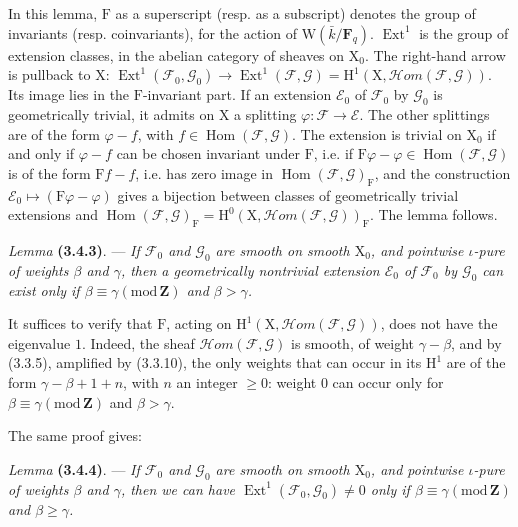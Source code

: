 \documentclass[11pt,leqno]{article}
\begin{document}
In this lemma, \(\mathrm{F}\) as a superscript (resp. as a subscript) denotes the group of invariants (resp. coinvariants), for the action of \(\mathrm{W}(\bar{k}/\mathbf{F}_q)\). \(\operatorname{Ext}^1\) is the group of extension classes, in the abelian category of sheaves on \(\mathrm{X}_0\). The right-hand arrow is pullback to \(\mathrm{X}\): \(\operatorname{Ext}^1(\mathscr{F}_0,\mathscr{G}_0)\to\operatorname{Ext}^1(\mathscr{F},\mathscr{G})=\mathrm{H}^1(\mathrm{X},\mathscr{H}\!om(\mathscr{F},\mathscr{G}))\). Its image lies in the \(\mathrm{F}\)-invariant part. If an extension \(\mathscr{E}_0\) of \(\mathscr{F}_0\) by \(\mathscr{G}_0\) is geometrically trivial, it admits on \(\mathrm{X}\) a splitting \(\varphi:\mathscr{F}\to\mathscr{E}\). The other splittings are of the form \(\varphi-f\), with \(f\in\operatorname{Hom}(\mathscr{F},\mathscr{G})\). The extension is trivial on \(\mathrm{X}_0\) if and only if \(\varphi-f\) can be chosen invariant under \(\mathrm{F}\), i.e. if \(\mathrm{F}\varphi-\varphi\in\operatorname{Hom}(\mathscr{F},\mathscr{G})\) is of the form \(\mathrm{F}f-f\), i.e. has zero image in \(\operatorname{Hom}(\mathscr{F},\mathscr{G})_{\mathrm{F}}\), and the construction \(\mathscr{E}_0\mapsto(\mathrm{F}\varphi-\varphi)\) gives a bijection between classes of geometrically trivial extensions and \(\operatorname{Hom}(\mathscr{F},\mathscr{G})_{\mathrm{F}}=\mathrm{H}^0(\mathrm{X},\mathscr{H}\!om(\mathscr{F},\mathscr{G}))_{\mathrm{F}}\). The lemma follows.

\textit{Lemma} \textbf{(3.4.3)}. — \textit{If \(\mathscr{F}_0\) and \(\mathscr{G}_0\) are smooth on smooth \(\mathrm{X}_0\), and pointwise \(\iota\)-pure of weights \(\beta\) and \(\gamma\), then a geometrically nontrivial extension \(\mathscr{E}_0\) of \(\mathscr{F}_0\) by \(\mathscr{G}_0\) can exist only if \(\beta\equiv\gamma(\mathrm{mod}\,\mathbf{Z})\) and \(\beta>\gamma\).}

It suffices to verify that \(\mathrm{F}\), acting on \(\mathrm{H}^1(\mathrm{X},\mathscr{H}\!om(\mathscr{F},\mathscr{G}))\), does not have the eigenvalue \(1\). Indeed, the sheaf \(\mathscr{H}\!om(\mathscr{F},\mathscr{G})\) is smooth, of weight \(\gamma-\beta\), and by (3.3.5), amplified by (3.3.10), the only weights that can occur in its \(\mathrm{H}^1\) are of the form \(\gamma-\beta+1+n\), with \(n\) an integer \(\geq0\): weight \(0\) can occur only for \(\beta\equiv\gamma(\mathrm{mod}\,\mathbf{Z})\) and \(\beta>\gamma\).

The same proof gives:

\textit{Lemma} \textbf{(3.4.4)}. — \textit{If \(\mathscr{F}_0\) and \(\mathscr{G}_0\) are smooth on smooth \(\mathrm{X}_0\), and pointwise \(\iota\)-pure of weights \(\beta\) and \(\gamma\), then we can have \(\operatorname{Ext}^1(\mathscr{F}_0,\mathscr{G}_0)\neq0\) only if \(\beta\equiv\gamma(\mathrm{mod}\,\mathbf{Z})\) and \(\beta\geq\gamma\).}
\end{document}
